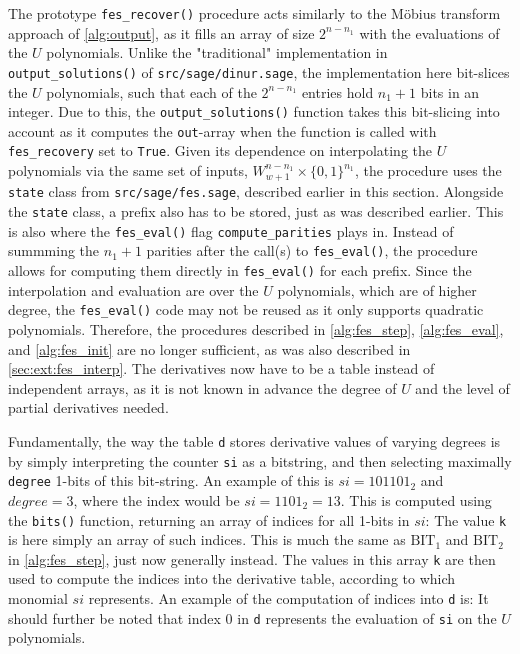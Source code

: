 The prototype \texttt{fes\_recover()} procedure acts similarly to the Möbius transform approach of \cref{alg:output}, as it fills an array of size $2^{n - n_1}$ with the evaluations of the $U$ polynomials. Unlike the "traditional" implementation in \texttt{output\_solutions()} of \texttt{src/sage/dinur.sage}, the implementation here bit-slices the $U$ polynomials, such that each of the $2^{n - n_1}$ entries hold $n_1 + 1$ bits in an integer. Due to this, the \texttt{output\_solutions()} function takes this bit-slicing into account as it computes the \texttt{out}-array when the function is called with \texttt{fes\_recovery} set to \texttt{True}.
Given its dependence on interpolating the $U$ polynomials via the same set of inputs, $W^{n - n_1}_{w + 1} \times \{0,1\}^{n_1}$, the procedure uses the \texttt{state} class from \texttt{src/sage/fes.sage}, described earlier in this section. Alongside the \texttt{state} class, a prefix also has to be stored, just as was described earlier. This is also where the \texttt{fes\_eval()} flag \texttt{compute\_parities} plays in. Instead of summming the $n_1 + 1$ parities after the call(s) to \texttt{fes\_eval()}, the procedure allows for computing them directly in \texttt{fes\_eval()} for each prefix. Since the interpolation and evaluation are over the $U$ polynomials, which are of higher degree, the \texttt{fes\_eval()} code may not be reused as it only supports quadratic polynomials. Therefore, the procedures described in \cref{alg:fes_step}, \cref{alg:fes_eval}, and \cref{alg:fes_init} are no longer sufficient, as was also described in \cref{sec:ext:fes_interp}. The derivatives now have to be a table instead of independent arrays, as it is not known in advance the degree of $U$ and the level of partial derivatives needed.

Fundamentally, the way the table \texttt{d} stores derivative values of varying degrees is by simply interpreting the counter \texttt{si} as a bitstring, and then selecting maximally \texttt{degree} 1-bits of this bit-string. An example of this is $si = 101101_2$ and $degree = 3$, where the index would be $si = 1101_2 = 13$. This is computed using the \texttt{bits()} function, returning an array of indices for all 1-bits in $si$:
The value \texttt{k} is here simply an array of such indices. This is much the same as $\text{BIT}_1$ and $\text{BIT}_2$ in \cref{alg:fes_step}, just now generally instead. The values in this array \texttt{k} are then used to compute the indices into the derivative table, according to which monomial $si$ represents. An example of the computation of indices into \texttt{d} is:
It should further be noted that index $0$ in \texttt{d} represents the evaluation of \texttt{si} on the $U$ polynomials. 

